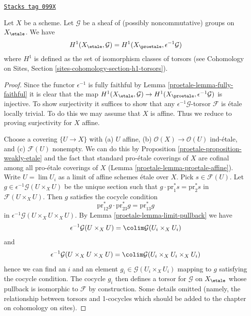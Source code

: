 \begin{lemma}
\label{proetale-lemma-compare-cohomology-nonabelian}
\href{https://stacks.math.columbia.edu/tag/099X}{\texttt{Stacks tag 099X}}

Let $X$ be a scheme. Let $\mathcal{G}$ be a sheaf of (possibly
noncommutative) groups on $X_\etale$. We have
$$
H^1(X_\etale, \mathcal{G}) =
H^1(X_\proetale, \epsilon^{-1}\mathcal{G})
$$
where $H^1$ is defined as the set of isomorphism classes of
torsors (see
Cohomology on Sites, Section \ref{sites-cohomology-section-h1-torsors}).
\end{lemma}

\begin{proof}

Since the functor $\epsilon^{-1}$ is fully faithful by
Lemma \ref{proetale-lemma-fully-faithful}
it is clear that the map
$H^1(X_\etale, \mathcal{G}) \to H^1(X_\proetale, \epsilon^{-1}\mathcal{G})$
is injective. To show surjectivity it suffices to show that
any $\epsilon^{-1}\mathcal{G}$-torsor $\mathcal{F}$ is \'etale
locally trivial. To do this we may assume that $X$ is affine.
Thus we reduce to proving surjectivity for $X$ affine.

\medskip\noindent
Choose a covering $\{U \to X\}$ with (a) $U$ affine, (b)
$\mathcal{O}(X) \to \mathcal{O}(U)$ ind-\'etale, and (c) $\mathcal{F}(U)$
nonempty. We can do this by Proposition \ref{proetale-proposition-weakly-etale}
and the fact that
standard pro-\'etale coverings of $X$ are cofinal among all pro-\'etale
coverings of $X$ (Lemma \ref{proetale-lemma-proetale-affine}).
Write $U = \lim U_i$ as a limit of affine schemes \'etale over $X$.
Pick $s \in \mathcal{F}(U)$. Let
$g \in \epsilon^{-1}\mathcal{G}(U \times_X U)$
be the unique section such that $g \cdot \text{pr}_1^*s = \text{pr}_2^*s$ in
$\mathcal{F}(U \times_X U)$. Then $g$ satisfies the cocycle condition
$$
\text{pr}_{12}^*g \cdot \text{pr}_{23}^*g = \text{pr}_{13}^*g
$$
in $\epsilon^{-1}\mathcal{G}(U \times_X U \times_X U)$. By
Lemma \ref{proetale-lemma-limit-pullback}
we have
$$
\epsilon^{-1}\mathcal{G}(U \times_X U) =
\colim \mathcal{G}(U_i \times_X U_i)
$$
and
$$
\epsilon^{-1}\mathcal{G}(U \times_X U \times_X U) =
\colim \mathcal{G}(U_i \times_X U_i \times_X U_i)
$$
hence we can find an $i$ and an element $g_i \in \mathcal{G}(U_i \times_X U_i)$
mapping to $g$ satisfying the cocycle condition.
The cocycle $g_i$ then defines a torsor for $\mathcal{G}$ on
$X_\etale$ whose pullback is isomorphic to $\mathcal{F}$
by construction. Some details omitted (namely, the relationship
between torsors and 1-cocycles which should be added to the chapter
on cohomology on sites).
\end{proof}


